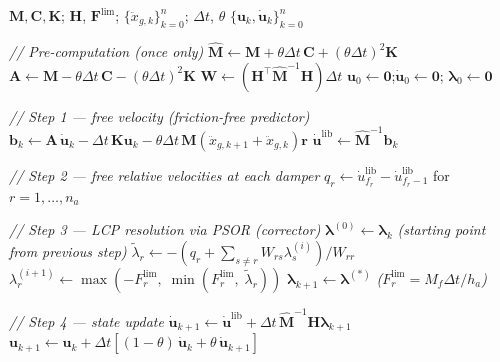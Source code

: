 \documentclass[preprint,12pt,authoryear]{elsarticle}
\newcommand{\Mf}{M_{\!f}}
\newcommand{\ha}{h_a}
\begin{document}
\begin{algorithm}[t]
\caption{NSD-LCP-PSOR applied to MDOF frames with RFD}
\label{alg:nsd-lcp-psor}
\begin{algorithmic}[1]
\Require $\bm{M},\bm{C},\bm{K}$; $\bm{H}$, $\bm{F}^{\lim}$;
         $\{\ddot{x}_{g,k}\}_{k=0}^{n}$; $\Delta t$, $\theta$
\Ensure  $\{\bm{u}_k,\dot{\bm{u}}_k\}_{k=0}^{n}$

\vspace{2pt}
\State \textit{// Pre-computation (once only)}
\State $\hat{\bm{M}} \leftarrow \bm{M} + \theta\Delta t\,\bm{C} + (\theta\Delta t)^{2}\bm{K}$
\State $\bm{A} \leftarrow \bm{M} - \theta\Delta t\,\bm{C} - (\theta\Delta t)^{2}\bm{K}$
\State $\bm{W} \leftarrow \left(\bm{H}^{\top}\hat{\bm{M}}^{-1}\bm{H}\right)\Delta t$
\State $\bm{u}_0 \leftarrow \bm{0}$;\quad $\dot{\bm{u}}_0 \leftarrow \bm{0}$;\quad
       $\bm{\lambda}_0 \leftarrow \bm{0}$

\vspace{2pt}
    \vspace{2pt}
    \State \textit{// Step 1 — free velocity (friction-free predictor)}
    \State $\bm{b}_k \leftarrow \bm{A}\,\dot{\bm{u}}_k
            - \Delta t\,\bm{K}\bm{u}_k
            - \theta\Delta t\,\bm{M}
              \!\left(\ddot{x}_{g,k+1}+\ddot{x}_{g,k}\right)\bm{r}$
    \State $\dot{\bm{u}}^{\mathrm{lib}} \leftarrow \hat{\bm{M}}^{-1}\bm{b}_k$

    \vspace{2pt}
    \State \textit{// Step 2 — free relative velocities at each damper}
    \State $q_r \leftarrow \dot{u}^{\mathrm{lib}}_{f_r} - \dot{u}^{\mathrm{lib}}_{f_r-1}$
           \quad for $r = 1,\ldots,n_a$

    \vspace{2pt}
    \State \textit{// Step 3 — LCP resolution via PSOR (corrector)}
    \State $\bm{\lambda}^{(0)} \leftarrow \bm{\lambda}_k$
           \quad\textit{(starting point from previous step)}
            \State $\tilde{\lambda}_r \leftarrow
                   -\!\left(q_r + \sum_{s \neq r} W_{rs}\lambda_s^{(i)}\right)\!\big/W_{rr}$
            \State $\lambda_r^{(i+1)} \leftarrow
                   \max\!\left(-F^{\lim}_r,\;\min\!\left(F^{\lim}_r,\;\tilde{\lambda}_r\right)\right)$
        \EndFor
    \EndWhile
    \State $\bm{\lambda}_{k+1} \leftarrow \bm{\lambda}^{(*)}$
           \quad\textit{($F^{\lim}_r = \Mf\Delta t/\ha$)}

    \vspace{2pt}
    \State \textit{// Step 4 — state update}
    \State $\dot{\bm{u}}_{k+1} \leftarrow
           \dot{\bm{u}}^{\mathrm{lib}} +
           \Delta t\,\hat{\bm{M}}^{-1}\bm{H}\bm{\lambda}_{k+1}$
    \State $\bm{u}_{k+1} \leftarrow \bm{u}_k +
           \Delta t\!\left[(1-\theta)\,\dot{\bm{u}}_k +
                           \theta\,\dot{\bm{u}}_{k+1}\right]$
\EndFor
\end{algorithmic}
\end{algorithm}
\end{document}
